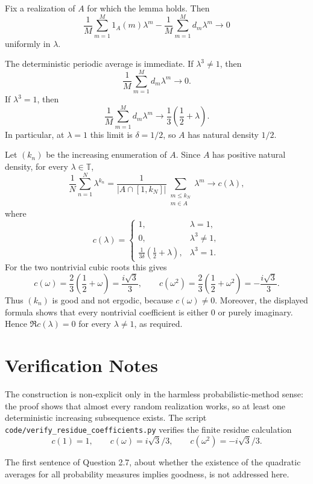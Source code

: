 \documentclass[11pt]{article}
\newcommand{\T}{\mathbb T}
\begin{document}
Fix a realization of $A$ for which the lemma holds.  Then
\[
 \frac1M\sum_{m=1}^M 1_A(m)\lambda^m
 -
 \frac1M\sum_{m=1}^M d_m\lambda^m
 \longrightarrow 0
\]
uniformly in $\lambda$.

The deterministic periodic average is immediate.  If $\lambda^3\neq1$, then
\[
        \frac1M\sum_{m=1}^M d_m\lambda^m \longrightarrow 0.
\]
If $\lambda^3=1$, then
\[
        \frac1M\sum_{m=1}^M d_m\lambda^m
        \longrightarrow
        \frac13\left(\frac12+\lambda\right).
\]
In particular, at $\lambda=1$ this limit is $\delta=1/2$, so $A$ has natural density $1/2$.

Let $(k_n)$ be the increasing enumeration of $A$.  Since $A$ has positive natural density, for every $\lambda\in\T$,
\[
        \frac1N\sum_{n=1}^N \lambda^{k_n}
        =
        \frac{1}{|A\cap[1,k_N]|}\sum_{\substack{m\leq k_N\\m\in A}}\lambda^m
        \longrightarrow c(\lambda),
\]
where
\[
c(\lambda)=
\begin{cases}
1, & \lambda=1,\\
0, & \lambda^3\neq 1,\\
\displaystyle \frac{1}{3\delta}\left(\frac12+\lambda\right),
  & \lambda^3=1.
\end{cases}
\]
For the two nontrivial cubic roots this gives
\[
        c(\omega)=\frac23\left(\frac12+\omega\right)=\frac{i\sqrt3}{3},
        \qquad
        c(\omega^2)=\frac23\left(\frac12+\omega^2\right)=-\frac{i\sqrt3}{3}.
\]
Thus $(k_n)$ is good and not ergodic, because $c(\omega)\neq0$.  Moreover, the displayed formula shows that every nontrivial coefficient is either $0$ or purely imaginary.  Hence $\Re c(\lambda)=0$ for every $\lambda\neq1$, as required.

\section*{Verification Notes}

The construction is non-explicit only in the harmless probabilistic-method sense: the proof shows that almost every random realization works, so at least one deterministic increasing subsequence exists.  The script \texttt{code/verify\_residue\_coefficients.py} verifies the finite residue calculation
\[
        c(1)=1,\qquad c(\omega)=i\sqrt3/3,\qquad c(\omega^2)=-i\sqrt3/3.
\]

The first sentence of Question 2.7, about whether the existence of the quadratic averages for all probability measures implies goodness, is not addressed here.
\end{document}

